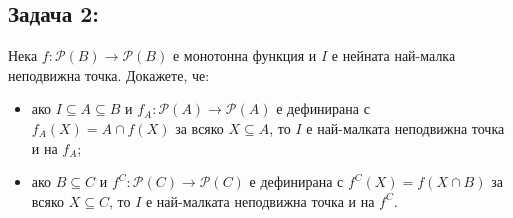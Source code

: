 \documentclass[french]{article}
\begin{document}
	\subsection*{Задача 2:}
	Нека $f : \mathcal{P}(B) \to \mathcal{P}(B)$ е монотонна функция и $I$ е нейната най-малка неподвижна точка. Докажете, че:
	\begin{itemize} 
		\item ако $I \subseteq A \subseteq B$ и $f_A : \mathcal{P}(A) \to \mathcal{P}(A)$ е дефинирана с $f_A(X) = A \cap f(X)$ за всяко $X \subseteq A$, то $I$ е най-малката неподвижна точка и на $f_A$;

		
		\item ако $B \subseteq C$ и $f^C : \mathcal{P}(C) \to \mathcal{P}(C)$ е дефинирана с $f^C(X) = f(X \cap B)$ за всяко $X \subseteq C$, то $I$ е най-малката неподвижна точка и на $f^C$.
	\end{itemize}
	
\end{document}
